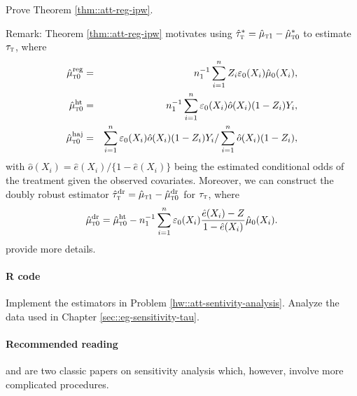 Prove Theorem \ref{thm::att-reg-ipw}. 

Remark:  Theorem \ref{thm::att-reg-ipw} motivates using $\hat{\tau}_{\textsc{t}}^* = \hat{\mu}_{\textsc{t}1}  - \hat{\mu}_{\textsc{t}0}^*$ to estimate $\tau_{\textsc{t}}$, where  
 \begin{eqnarray*}
\hat{\mu}_{\textsc{t}0}^\text{reg} &=& n_1^{-1} \sum_{i=1}^n Z_i  \varepsilon_0(X_i) \hat  \mu_0(X_i) ,   \\
\hat{\mu}_{\textsc{t}0}^\text{ht} &=& n_1^{-1} \sum_{i=1}^n   \varepsilon_0(X_i) \hat  o(X_i) (1-Z_i) Y_i ,   \\
\hat{\mu}_{\textsc{t}0}^\text{haj} &=&  \sum_{i=1}^n   \varepsilon_0(X_i) \hat  o(X_i) (1-Z_i) Y_i  /  \sum_{i=1}^n   \hat  o(X_i) (1-Z_i) , 
\end{eqnarray*}
with $  \hat  o(X_i) = \hat  e(X_i) / \{1- \hat  e(X_i)\}$ being the estimated conditional odds of the treatment given the observed covariates. 
Moreover, we can construct the doubly robust estimator 
$\hat{\tau}_{\textsc{t}}^\text{dr} = \hat{\mu}_{\textsc{t}1}  - \hat{\mu}_{\textsc{t}0}^\text{dr}$ for $\tau_{\textsc{t}}$, where
$$
\hat{\mu}_{\textsc{t}0}^\text{dr} = 
\hat{\mu}_{\textsc{t}0}^\text{ht}  - n_1^{-1} \sum_{i=1}^n \varepsilon_0(X_i) \frac{\hat e(X_i) - Z}{1-\hat e(X_i)}  \hat \mu_0(X_i)  . 
$$
\citet{luding2023flexible} provide more details. 



\paragraph{R code}

Implement the estimators in Problem \ref{hw::att-sentivity-analysis}. 
Analyze the data used in Chapter \ref{sec::eg-sensitivity-tau}. 


\paragraph{Recommended reading}

 \citet{Rosenbaum::1983JRSSB} and \citet{imbens2003sensitivity} are two classic papers on sensitivity analysis which, however, involve more complicated procedures. 


